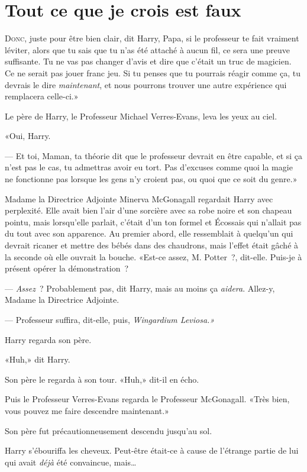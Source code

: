 \chapter{Tout ce que je crois est faux}

\lettrine[ante=«]{D}{onc}, juste pour être bien clair, dit Harry, Papa, si le professeur te fait vraiment léviter, alors que tu sais que tu n'as été attaché à aucun fil, ce sera une preuve suffisante. Tu ne vas pas changer d'avis et dire que c'était un truc de magicien. Ce ne serait pas jouer franc jeu. Si tu penses que tu pourrais réagir comme ça, tu devrais le dire \emph{maintenant}, et nous pourrons trouver une autre expérience qui remplacera celle-ci.»

Le père de Harry, le Professeur Michael Verres-Evans, leva les yeux au ciel.

«Oui, Harry.

--- Et toi, Maman, ta théorie dit que le professeur devrait en être capable, et si ça n'est pas le cas, tu admettras avoir eu tort. Pas d'excuses comme quoi la magie ne fonctionne pas lorsque les gens n'y croient pas, ou quoi que ce soit du genre.»

Madame la Directrice Adjointe Minerva McGonagall regardait Harry avec perplexité. Elle avait bien l'air d'une sorcière avec sa robe noire et son chapeau pointu, mais lorsqu'elle parlait, c'était d'un ton formel et Écossais qui n'allait pas du tout avec son apparence. Au premier abord, elle ressemblait à quelqu'un qui devrait ricaner et mettre des bébés dans des chaudrons, mais l'effet était gâché à la seconde où elle ouvrait la bouche. «Est-ce assez, M. Potter~?, dit-elle. Puis-je à présent opérer la démonstration~?

--- \emph{Assez}~? Probablement pas, dit Harry, mais au moins ça \emph{aidera}. Allez-y, Madame la Directrice Adjointe.

--- Professeur suffira, dit-elle, puis, \emph{Wingardium Leviosa.»}

Harry regarda son père.

«Huh,» dit Harry.

Son père le regarda à son tour. «Huh,» dit-il en écho.

Puis le Professeur Verres-Evans regarda le Professeur McGonagall. «Très bien, vous pouvez me faire descendre maintenant.»

Son père fut précautionneusement descendu jusqu'au sol.

Harry s'ébouriffa les cheveux. Peut-être était-ce à cause de l'étrange partie de lui qui avait \emph{déjà} été convaincue, mais…

